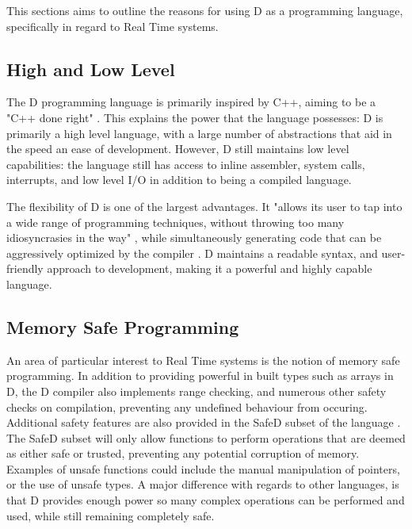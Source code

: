 This sections aims to outline the reasons for using D as a programming language,
specifically in regard to Real Time systems. 

\subsection{High and Low Level}
The D programming language is primarily inspired by C++, aiming to be a "C++ done
right" \cite{qznc.github.io/d-tut/philosophy.html}. This explains the 
power that the language possesses: D is primarily a high level language, with
a large number of abstractions that aid in the speed an ease of development. 
However, D still maintains low level capabilities: the language still has access 
to inline assembler, system calls, interrupts, and low level I/O in addition to 
being a compiled language.
\par\bigskip\noindent
The flexibility of D is one of the largest advantages. It "allows its user to tap 
into a wide range of programming techniques, without throwing too many 
idiosyncrasies in the way" \cite{ddili.org/ders/d.en/Programming_in_D.pdf}, 
while simultaneously generating code that can be aggressively optimized by the
compiler \cite{dlang.org/overview.html}. D maintains a readable syntax, and 
user-friendly approach to development, making it a powerful and highly capable 
language.

\subsection{Memory Safe Programming}
An area of particular interest to Real Time systems is the notion of memory 
safe programming. In addition to providing powerful in built types such as arrays 
in D, the D compiler also implements range checking, and numerous other 
safety checks on compilation, preventing any undefined behaviour from occuring.
Additional safety features are also provided in the SafeD subset of the language
\cite{dlang.org/safed.html}. The SafeD subset will only allow functions to perform 
operations that are deemed as either safe or trusted, preventing any 
potential corruption of memory. Examples of unsafe functions could include the 
manual manipulation of pointers, or the use of unsafe types. A major difference 
with regards to other languages, is that D provides enough power so many complex 
operations can be performed and used, while still remaining completely safe.

